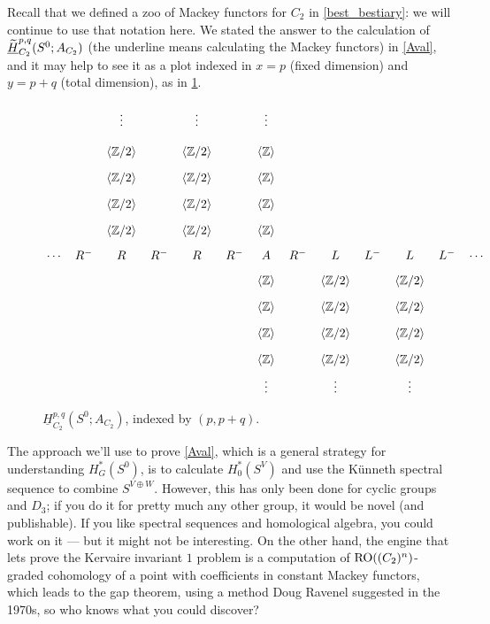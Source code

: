 Recall that we defined a zoo of Mackey functors for $C_2$ in \cref{best_bestiary}: we will continue to use that
notation here. We stated the answer to the calculation of $\underline{\widetilde H}_{C_2}^{p,q}(S^0;A_{C_2})$ (the underline
means calculating the Mackey functors) in \cref{Aval}, and it may help to see it as a plot indexed in $x = p$
(fixed dimension) and $y = p+q$ (total dimension), as in \cref{ROgdiag}.
\begin{figure}[h!]
\[\xymatrix@R=0.2cm@C=0.2cm{ %
	& & \vdots     && \vdots     && \vdots\\
	& & \ang{\Z/2} && \ang{\Z/2} && \ang\Z\\
	& & \ang{\Z/2} && \ang{\Z/2} && \ang\Z\\
	& & \ang{\Z/2} && \ang{\Z/2} && \ang\Z\\
	& & \ang{\Z/2} && \ang{\Z/2} && \ang\Z\\
	\dotsb & R^- & R & R^- & R & R^- & A & R^- & L & L^- & L & L^- & \dotsb\\
	& & & & & & \ang\Z && \ang{\Z/2} && \ang{\Z/2}\\
	& & & & & & \ang\Z && \ang{\Z/2} && \ang{\Z/2}\\
	& & & & & & \ang\Z && \ang{\Z/2} && \ang{\Z/2}\\
	& & & & & & \ang\Z && \ang{\Z/2} && \ang{\Z/2}\\
	& & & & & & \vdots && \vdots && \vdots
}\]
\caption{$\underline H_{C_2}^{p,q}(S^0;A_{C_2})$, indexed by $(p,p+q)$.}
\label{ROgdiag}
\end{figure}

The approach we'll use to prove \cref{Aval}, which is a general strategy for understanding $H_G^*(S^0)$, is to
calculate $H_0^*(S^V)$ and use the Künneth spectral sequence to combine
$S^{V\oplus W}$. However, this has only been done for cyclic groups and $D_3$; if you do it for pretty much any
other group, it would be novel (and publishable). If you like spectral sequences and homological algebra, you could
work on it --- but it might not be interesting. On the other hand, the engine that lets \cite{HHR} prove the
Kervaire invariant $1$ problem is a computation of $\mathrm{RO}((C_2)^n)$-graded cohomology of a point with coefficients in
constant Mackey functors, which leads to the gap theorem, using a method Doug Ravenel suggested in the 1970s, so
who knows what you could discover?

